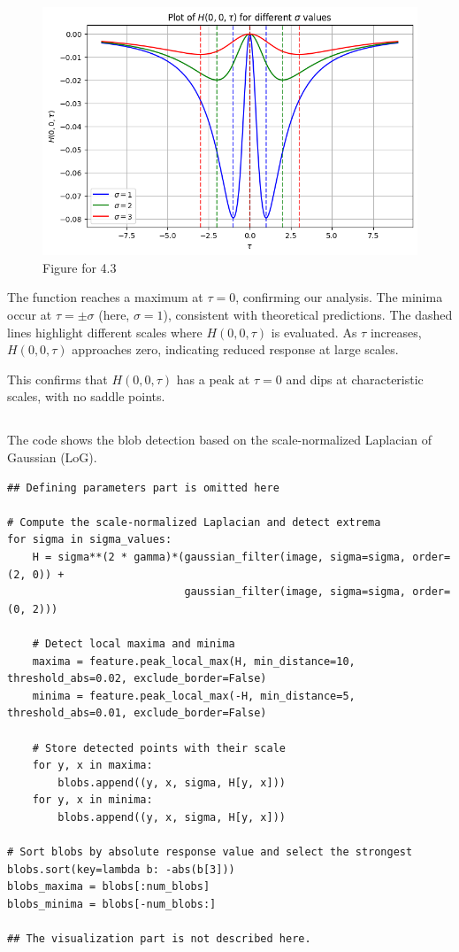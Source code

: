 \documentclass[12pt]{article}
\begin{document}
\begin{enumerate}[label=\roman*., leftmargin=1cm]
    \FloatBarrier

\begin{figure}[ht]
    \centering
    \includegraphics[width=0.7\columnwidth, keepaspectratio]{pics/a5-4.3.png}
    \caption[]{Figure for 4.3}
    \label{fig:4.3}
\end{figure}

\FloatBarrier

The function reaches a maximum at \( \tau = 0 \), confirming our analysis. The minima occur at \( \tau = \pm\sigma \) (here, \( \sigma = 1 \)), consistent with theoretical predictions. The dashed lines highlight different scales where \( H(0,0,\tau) \) is evaluated. As \( \tau \) increases, \( H(0,0,\tau) \) approaches zero, indicating reduced response at large scales.

This confirms that \( H(0,0,\tau) \) has a peak at \( \tau = 0 \) and dips at characteristic scales, with no saddle points.
\end{enumerate}

\subsection{}
The code shows the blob detection based on the scale-normalized Laplacian of Gaussian (LoG).
\begin{lstlisting}[caption={Code for 4.4},captionpos=b]
## Defining parameters part is omitted here

# Compute the scale-normalized Laplacian and detect extrema
for sigma in sigma_values:
    H = sigma**(2 * gamma)*(gaussian_filter(image, sigma=sigma, order=(2, 0)) +
                            gaussian_filter(image, sigma=sigma, order=(0, 2)))

    # Detect local maxima and minima
    maxima = feature.peak_local_max(H, min_distance=10, threshold_abs=0.02, exclude_border=False)
    minima = feature.peak_local_max(-H, min_distance=5, threshold_abs=0.01, exclude_border=False)

    # Store detected points with their scale
    for y, x in maxima:
        blobs.append((y, x, sigma, H[y, x]))
    for y, x in minima:
        blobs.append((y, x, sigma, H[y, x]))

# Sort blobs by absolute response value and select the strongest
blobs.sort(key=lambda b: -abs(b[3]))
blobs_maxima = blobs[:num_blobs]
blobs_minima = blobs[-num_blobs:]

## The visualization part is not described here.

\end{lstlisting}
\end{document}
